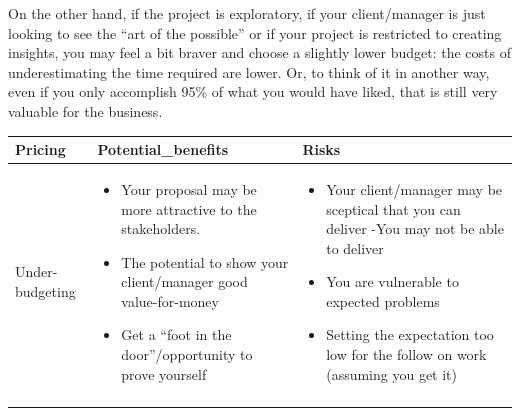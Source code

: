 \documentclass[
]{book}
\providecommand{\tightlist}{%
  \setlength{\itemsep}{0pt}\setlength{\parskip}{0pt}}
\begin{document}
On the other hand, if the project is exploratory, if your client/manager is just looking to see the ``art of the possible'' or if your project is restricted to creating insights, you may feel a bit braver and choose a slightly lower budget: the costs of underestimating the time required are lower. Or, to think of it in another way, even if you only accomplish 95\% of what you would have liked, that is still very valuable for the business.

\begin{longtable}[]{@{}lll@{}}
\toprule
\begin{minipage}[b]{0.23\columnwidth}\raggedright
Pricing\strut
\end{minipage} & \begin{minipage}[b]{0.29\columnwidth}\raggedright
Potential\_benefits\strut
\end{minipage} & \begin{minipage}[b]{0.29\columnwidth}\raggedright
Risks\strut
\end{minipage}\tabularnewline
\midrule
\endhead
\begin{minipage}[t]{0.23\columnwidth}\raggedright
Under-budgeting\strut
\end{minipage} & \begin{minipage}[t]{0.29\columnwidth}\raggedright
\begin{itemize}
\tightlist
\item
  Your proposal may
  be more attractive
  to the stakeholders.
\item
  The potential to
  show your
  client/manager good
  value-for-money
\item
  Get a ``foot in
  the
  door''/opportunity
  to prove yourself
\end{itemize}\strut
\end{minipage} & \begin{minipage}[t]{0.29\columnwidth}\raggedright
\begin{itemize}
\tightlist
\item
  Your
  client/manager may
  be sceptical that
  you can deliver
  -You may not be
  able to deliver
\item
  You are
  vulnerable to
  expected problems
\item
  Setting the
  expectation too low
  for the follow on
  work (assuming you
  get it)
\end{itemize}\strut
\end{minipage}\tabularnewline
\begin{minipage}[t]{0.23\columnwidth}\raggedright

\end{minipage}
\end{longtable}
\end{document}
